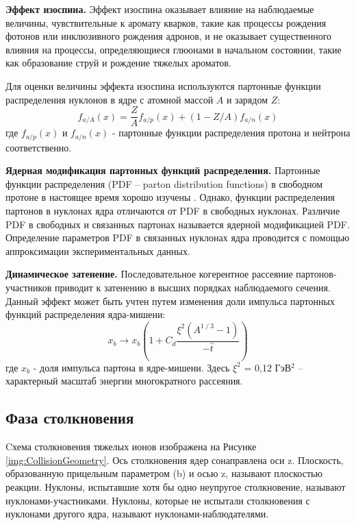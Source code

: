 \textbf{Эффект изоспина.}
Эффект изоспина оказывает влияние на наблюдаемые величины, чувствительные к аромату кварков, такие как процессы рождения фотонов или инклюзивного рождения адронов, и не оказывает существенного влияния на процессы, определяющиеся глюонами в начальном состоянии, такие как образование струй и рождение тяжелых ароматов. 

Для оценки величины эффекта изоспина используются партонные функции распределения нуклонов в ядре с атомной массой $A$ и зарядом $Z$:
$$f_{a/A}(x) = \frac{Z}{A}f_{a/p}(x)+\left(1-Z/A \right) f_{a/n}(x)$$
где $f_{a/p}(x)$ и $f_{a/n}(x)$ - партонные функции распределения протона и нейтрона соответственно. 

\textbf{Ядерная модификация партонных функций распределения.}
Партонные функции распределения (PDF -- parton distribution functions) в свободном протоне в настоящее время хорошо изучены \cite{PDF1, PDF2, PDF3}.
Однако, функции распределения партонов в нуклонах ядра отличаются от PDF в свободных нуклонах. Различие PDF в свободных и связанных партонах называется ядерной модификацией PDF. 
Определение параметров PDF в связанных нуклонах ядра проводится с помощью аппроксимации экспериментальных данных.

\textbf{Динамическое затенение.}
Последовательное когерентное рассеяние партонов-участников приводит к затенению в высших порядках наблюдаемого сечения. Данный эффект может быть учтен путем изменения доли импульса партонных функций распределения ядра-мишени:
$$x_b \rightarrow x_b \left(1+C_d  \frac{\xi^2 (A^{1⁄3}-1)}{-\hat{t}} \right)$$
где $x_b$ - доля импульса партона в ядре-мишени. Здесь $\xi ^2$ = 0,12 ГэВ$^2$ – характерный масштаб энергии многократного рассеяния. 


\subsection{Фаза столкновения} 
Cхема столкновения тяжелых ионов изображена на Рисунке \ref{img:CollisionGeometry}. Ось столкновения ядер сонаправлена оси z. Плоскость, образованную прицельным параметром (b) и осью z, называют плоскостью реакции.  
Нуклоны, испытавшие хотя бы одно неупругое столкновение, называют нуклонами-участниками. Нуклоны, которые не испытали столкновения с нуклонами другого ядра, называют нуклонами-наблюдателями.

